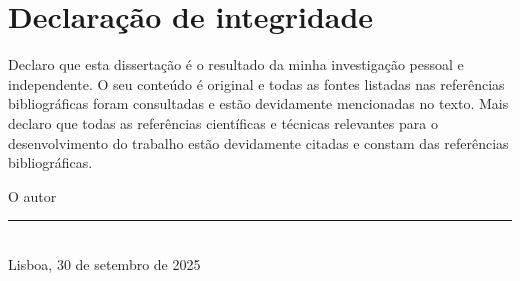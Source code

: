 
\chapter{Declaração de integridade}

Declaro que esta dissertação é o resultado da minha investigação pessoal e independente. O seu conteúdo é original e todas as fontes listadas nas referências bibliográficas foram consultadas e estão devidamente mencionadas no texto. Mais declaro que todas as referências científicas e técnicas relevantes para o desenvolvimento do trabalho estão devidamente citadas e constam das referências bibliográficas.\vspace{24pt}

\begin{center}
	O autor\\\vspace{24pt}
	\rule{8cm}{.3pt}\\
	Lisboa, 30 de setembro de 2025
\end{center}
